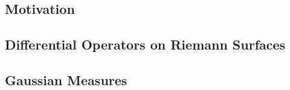 \subsection{Motivation}
    
\subsection{Differential Operators on Riemann Surfaces}
    
\subsection{Gaussian Measures}
    
